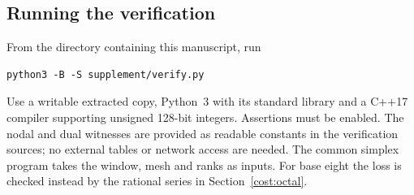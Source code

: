\documentclass[11pt,a4paper]{article}
\theoremstyle{paperplain}
\numberwithin{equation}{section}
\begin{document}
\subsection{Running the verification}
From the directory containing this manuscript, run
\begin{verbatim}
python3 -B -S supplement/verify.py
\end{verbatim}
Use a writable extracted copy, Python~3 with its standard library and
a C++17 compiler supporting unsigned 128-bit integers. Assertions must
be enabled. The nodal and dual witnesses are provided as readable
constants in the verification sources; no external tables or network
access are needed. The common simplex program takes the window, mesh
and ranks as inputs. For base eight the loss is checked instead by the
rational series in Section~\ref{cost:octal}.
\end{document}
